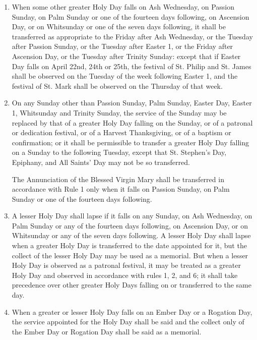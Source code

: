 
\begin{enumerate}

\item When some other greater Holy Day falls on Ash Wednesday, on Passion Sunday, on Palm Sunday or one of the fourteen days following, on Ascension Day, or on Whitsunday or one of the seven days following, it shall be transferred as appropriate to the Friday after Ash Wednesday, or the Tuesday after Passion Sunday, or the Tuesday after Easter 1, or the Friday after Ascension Day, or the Tuesday after Trinity Sunday: except that if Easter Day falls on April 22nd, 24th or 25th, the festival of St. Philip and St. James shall be observed on the Tuesday of the week following Easter 1, and the festival of St. Mark shall be observed on the Thursday of that week.

\item On any Sunday other than Passion Sunday, Palm Sunday, Easter Day, Easter 1, Whitsunday and Trinity Sunday, the service of the Sunday may be replaced by that of a greater Holy Day falling on the Sunday, or of a patronal or dedication festival, or of a Harvest Thanksgiving, or of a baptism or confirmation; or it shall be permissible to transfer a greater Holy Day falling on a Sunday to the following Tuesday, except that St. Stephen's Day, Epiphany, and All Saints' Day may not be so transferred.

      The Annunciation of the Blessed Virgin Mary shall be transferred in accordance with Rule 1 only when it falls on Passion Sunday, on Palm Sunday or one of the fourteen days following.

\item A lesser Holy Day shall lapse if it falls on any Sunday, on Ash Wednesday, on Palm Sunday or any of the fourteen days following, on Ascension Day, or on Whitsunday or any of the seven days following. A lesser Holy Day shall lapse when a greater Holy Day is transferred to the date appointed for it, but the collect of the lesser Holy Day may be used as a memorial. But when a lesser Holy Day is observed as a patronal festival, it may be treated as a greater Holy Day and observed in accordance with rules 1, 2, and 6; it shall take precedence over other greater Holy Days falling on or transferred to the same day.

\newpage

\item When a greater or lesser Holy Day falls on an Ember Day or a Rogation Day, the service appointed for the Holy Day shall be said and the collect only of the Ember Day or Rogation Day shall be said as a memorial.


\end{enumerate}
